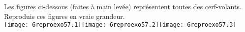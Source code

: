 Les figures ci-dessous (faites à main levée) représentent toutes des
  cerf-volants. Reproduis ces figures en vraie grandeur.
\\\texttt{[image: 6reproexo57.1]}\hfill\texttt{[image: 6reproexo57.2]}\hfill\texttt{[image: 6reproexo57.3]}